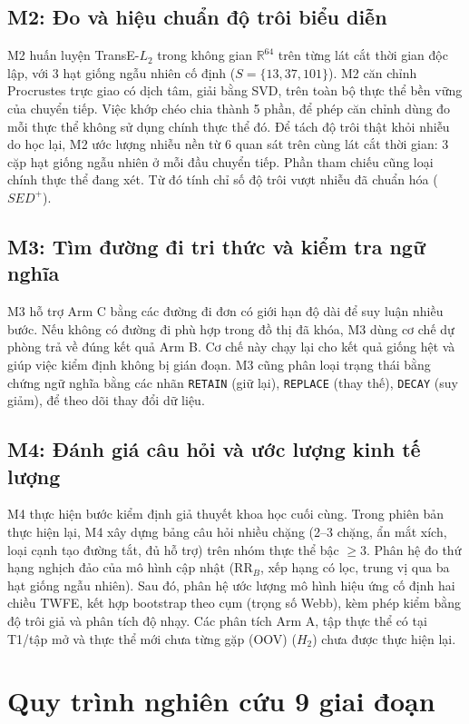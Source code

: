 \subsection{M2: Đo và hiệu chuẩn độ trôi biểu diễn}
M2 huấn luyện TransE-$L_2$ trong không gian $\mathbb{R}^{64}$ trên từng lát cắt thời gian độc lập, với 3 hạt giống ngẫu nhiên cố định ($S = \{13, 37, 101\}$). M2 căn chỉnh Procrustes trực giao có dịch tâm, giải bằng SVD, trên toàn bộ thực thể bền vững của chuyển tiếp. Việc khớp chéo chia thành 5 phần, để phép căn chỉnh dùng đo mỗi thực thể không sử dụng chính thực thể đó. Để tách độ trôi thật khỏi nhiễu do học lại, M2 ước lượng nhiễu nền từ 6 quan sát trên cùng lát cắt thời gian: 3 cặp hạt giống ngẫu nhiên ở mỗi đầu chuyển tiếp. Phần tham chiếu cũng loại chính thực thể đang xét. Từ đó tính chỉ số độ trôi vượt nhiễu đã chuẩn hóa ($SED^+$).

\subsection{M3: Tìm đường đi tri thức và kiểm tra ngữ nghĩa}
M3 hỗ trợ Arm C bằng các đường đi đơn có giới hạn độ dài để suy luận nhiều bước. Nếu không có đường đi phù hợp trong đồ thị đã khóa, M3 dùng cơ chế dự phòng trả về đúng kết quả Arm B. Cơ chế này chạy lại cho kết quả giống hệt và giúp việc kiểm định không bị gián đoạn. M3 cũng phân loại trạng thái bằng chứng ngữ nghĩa bằng các nhãn \texttt{RETAIN} (giữ lại), \texttt{REPLACE} (thay thế), \texttt{DECAY} (suy giảm), để theo dõi thay đổi dữ liệu.

\subsection{M4: Đánh giá câu hỏi và ước lượng kinh tế lượng}
M4 thực hiện bước kiểm định giả thuyết khoa học cuối cùng. Trong phiên bản thực hiện lại, M4 xây dựng bảng câu hỏi nhiều chặng (2--3 chặng, ẩn mắt xích, loại cạnh tạo đường tắt, đủ hỗ trợ) trên nhóm thực thể bậc $\geq 3$. Phân hệ đo thứ hạng nghịch đảo của mô hình cập nhật (RR$_B$, xếp hạng có lọc, trung vị qua ba hạt giống ngẫu nhiên). Sau đó, phân hệ ước lượng mô hình hiệu ứng cố định hai chiều TWFE, kết hợp bootstrap theo cụm (trọng số Webb), kèm phép kiểm bằng độ trôi giả và phân tích độ nhạy. Các phân tích Arm A, tập thực thể có tại T1/tập mở và thực thể mới chưa từng gặp (OOV) ($H_2$) chưa được thực hiện lại.

\section{Quy trình nghiên cứu 9 giai đoạn}
\label{sec:nine_stage_pipeline}

